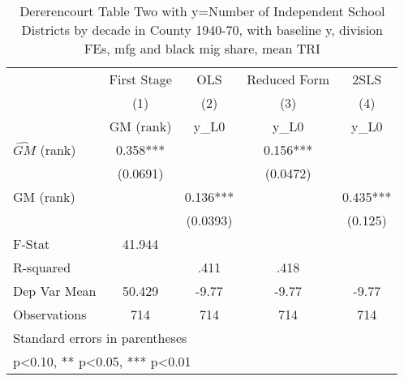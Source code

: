 \begin{table}[htbp]\centering
\def\sym#1{\ifmmode^{#1}\else\(^{#1}\)\fi}
\caption{Dererencourt Table Two with y=Number of Independent School Districts by decade in County 1940-70, with baseline y, division FEs, mfg and black mig share, mean TRI}
\begin{tabular}{l*{4}{c}}
\toprule
                    & First Stage   &         OLS   &Reduced Form   &        2SLS   \\
                    &\multicolumn{1}{c}{(1)}&\multicolumn{1}{c}{(2)}&\multicolumn{1}{c}{(3)}&\multicolumn{1}{c}{(4)}\\
                    &\multicolumn{1}{c}{GM  (rank)}&\multicolumn{1}{c}{y\_L0}&\multicolumn{1}{c}{y\_L0}&\multicolumn{1}{c}{y\_L0}\\
\midrule
$\hat{GM}$ (rank)   &       0.358***&               &       0.156***&               \\
                    &    (0.0691)   &               &    (0.0472)   &               \\
\addlinespace
GM  (rank)          &               &       0.136***&               &       0.435***\\
                    &               &    (0.0393)   &               &     (0.125)   \\
\midrule
F-Stat              &      41.944   &               &               &               \\
R-squared           &               &        .411   &        .418   &               \\
Dep Var Mean        &      50.429   &       -9.77   &       -9.77   &       -9.77   \\
Observations        &         714   &         714   &         714   &         714   \\
\bottomrule
\multicolumn{5}{l}{\footnotesize Standard errors in parentheses}\\
\multicolumn{5}{l}{\footnotesize * p<0.10, ** p<0.05, *** p<0.01}\\
\end{tabular}
\end{table}

